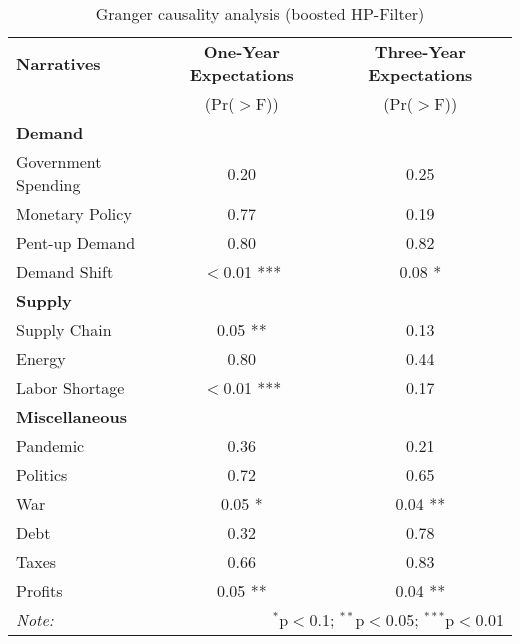 \begin{table}[ht]
\centering
\caption{Granger causality analysis (boosted HP-Filter)}\label{table:granger}

\begin{tabular}{lcc}
\toprule
\textbf{Narratives} & \textbf{One-Year Expectations} & \textbf{Three-Year Expectations} \\
& (Pr($>$F)) & (Pr($>$F)) \\
\midrule
\multicolumn{3}{l}{\textbf{Demand}} \\
\midrule
Government Spending & 0.20 & 0.25 \\
Monetary Policy & 0.77 & 0.19 \\
Pent-up Demand & 0.80 & 0.82 \\
Demand Shift & $<$0.01 *** & 0.08 * \\
\midrule
\multicolumn{3}{l}{\textbf{Supply}} \\
\midrule
Supply Chain & 0.05 ** & 0.13 \\
Energy & 0.80 & 0.44 \\
Labor Shortage & $<$0.01 *** & 0.17 \\
\midrule
\multicolumn{3}{l}{\textbf{Miscellaneous}} \\
\midrule
Pandemic & 0.36 & 0.21 \\
Politics & 0.72 & 0.65 \\
War & 0.05 * & 0.04 ** \\
Debt & 0.32 & 0.78 \\
Taxes & 0.66 & 0.83 \\
Profits & 0.05 ** & 0.04 ** \\
\midrule
\bottomrule
\textit{Note:}  & \multicolumn{2}{r}{$^{*}$p$<$0.1; $^{**}$p$<$0.05; $^{***}$p$<$0.01} \\
\bottomrule
\end{tabular}
\end{table}
